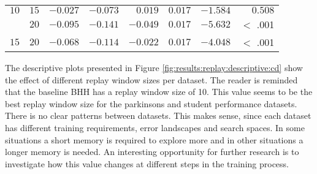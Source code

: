 \begin{table}[htbp]
{\begin{tabular}{lrrrrrrr}
                  $10$                 & $15$                 & $-0.027$             & $-0.073$                                        & $0.019$              & $0.017$              & $-1.584$             & $0.508$     \\
                  $ $                  & $20$                 & $-0.095$             & $-0.141$                                        & $-0.049$             & $0.017$              & $-5.632$             & $<$ .001    \\
                  $15$                 & $20$                 & $-0.068$             & $-0.114$                                        & $-0.022$             & $0.017$              & $-4.048$             & $<$ .001    \\
                  \bottomrule
            \end{tabular}
      }
\end{table}


The descriptive plots presented in Figure \ref{fig:results:replay:descriptive:cd} show the effect of different replay window sizes per dataset. The reader is reminded that the baseline \Ac{BHH} has a replay window size of 10. This value seems to be the best replay window size for the parkinsons and student performance datasets. There is no clear patterns between datasets. This makes sense, since each dataset has different training requirements, error landscapes and search spaces. In some situations a short memory is required to explore more and in other situations a longer memory is needed. An interesting opportunity for further research is to investigate how this value changes at different steps in the training process.

